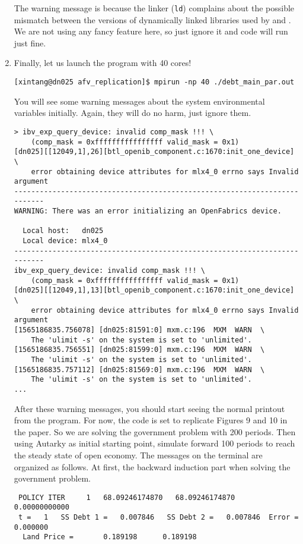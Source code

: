 \documentclass[twoside,11pt,leqno]{article}
\newcommand{\code}{\texttt}
\newcommand{\bcode}[1]{\texttt{\blue{#1}}}
\begin{document}
\begin{enumerate}[1.]
    The warning message is because the linker (\code{ld}) complains about the possible mismatch between the versions of dynamically linked libraries used by \bcode{gfortran} and \bcode{OpenMPI}. We are not using any fancy feature here, so just ignore it and code will run just fine.
    \item
    Finally, let us launch the program with 40 cores!
\begin{verbatim}
[xintang@dn025 afv_replication]$ mpirun -np 40 ./debt_main_par.out
\end{verbatim}
    You will see some warning messages about the system environmental variables initially. Again, they will do no harm, just ignore them.
\begin{verbatim}    
> ibv_exp_query_device: invalid comp_mask !!! \
    (comp_mask = 0xffffffffffffffff valid_mask = 0x1)
[dn025][[12049,1],26][btl_openib_component.c:1670:init_one_device] \
    error obtaining device attributes for mlx4_0 errno says Invalid argument
--------------------------------------------------------------------------
WARNING: There was an error initializing an OpenFabrics device.

  Local host:   dn025
  Local device: mlx4_0
--------------------------------------------------------------------------
ibv_exp_query_device: invalid comp_mask !!! \
    (comp_mask = 0xffffffffffffffff valid_mask = 0x1)
[dn025][[12049,1],13][btl_openib_component.c:1670:init_one_device] \
    error obtaining device attributes for mlx4_0 errno says Invalid argument
[1565186835.756078] [dn025:81591:0] mxm.c:196  MXM  WARN  \
    The 'ulimit -s' on the system is set to 'unlimited'.
[1565186835.756551] [dn025:81599:0] mxm.c:196  MXM  WARN  \
    The 'ulimit -s' on the system is set to 'unlimited'.
[1565186835.757112] [dn025:81569:0] mxm.c:196  MXM  WARN  \
    The 'ulimit -s' on the system is set to 'unlimited'.
...
\end{verbatim}
    After these warning messages, you should start seeing the normal printout from the program. For now, the code is set to replicate Figures 9 and 10 in the paper. So we are solving the government problem with 200 periods. Then using Autarky as initial starting point, simulate forward 100 periods to reach the steady state of open economy. The messages on the terminal are organized as follows. At first, the backward induction part when solving the government problem.
\begin{verbatim}    
 POLICY ITER     1   68.09246174870   68.09246174870    0.00000000000
 t =   1   SS Debt 1 =   0.007846   SS Debt 2 =   0.007846  Error =     0.000000
  Land Price =       0.189198      0.189198


\end{verbatim}
\end{enumerate}
\end{document}
